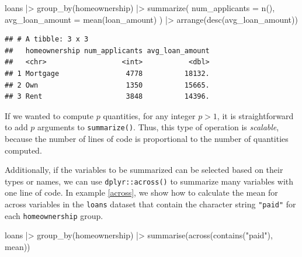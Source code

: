 \documentclass[12pt]{article}
\newenvironment{Shaded}{\begin{snugshade}}{\end{snugshade}}
\newcommand{\AttributeTok}[1]{\textcolor[rgb]{0.77,0.63,0.00}{#1}}
\newcommand{\FunctionTok}[1]{\textcolor[rgb]{0.00,0.00,0.00}{#1}}
\newcommand{\NormalTok}[1]{#1}
\newcommand{\SpecialCharTok}[1]{\textcolor[rgb]{0.00,0.00,0.00}{#1}}
\newcommand{\StringTok}[1]{\textcolor[rgb]{0.31,0.60,0.02}{#1}}
\begin{document}
\linespread{1}

\begin{Shaded}
\begin{Highlighting}[]
\NormalTok{loans }\SpecialCharTok{|\textgreater{}}
  \FunctionTok{group\_by}\NormalTok{(homeownership) }\SpecialCharTok{|\textgreater{}}
  \FunctionTok{summarize}\NormalTok{(}
    \AttributeTok{num\_applicants =} \FunctionTok{n}\NormalTok{(),}
    \AttributeTok{avg\_loan\_amount =} \FunctionTok{mean}\NormalTok{(loan\_amount)}
\NormalTok{  ) }\SpecialCharTok{|\textgreater{}}
  \FunctionTok{arrange}\NormalTok{(}\FunctionTok{desc}\NormalTok{(avg\_loan\_amount))}
\end{Highlighting}
\end{Shaded}

\begin{verbatim}
## # A tibble: 3 x 3
##   homeownership num_applicants avg_loan_amount
##   <chr>                  <int>           <dbl>
## 1 Mortgage                4778          18132.
## 2 Own                     1350          15665.
## 3 Rent                    3848          14396.
\end{verbatim}


\label{tidy-summary-again} \linespread{2}
\vspace{3mm}\setlength{\parindent}{15pt}

If we wanted to compute \(p\) quantities, for any integer \(p > 1\), it
is straightforward to add \(p\) arguments to \texttt{summarize()}. Thus,
this type of operation is \emph{scalable}, because the number of lines
of code is proportional to the number of quantities computed.

Additionally, if the variables to be summarized can be selected based on
their types or names, we can use \texttt{dplyr::across()} to summarize
many variables with one line of code. In example \ref{across}, we show
how to calculate the mean for across variables in the \texttt{loans}
dataset that contain the character string \texttt{"paid"} for each
\texttt{homeownership} group.

\linespread{1}

\begin{Shaded}
\begin{Highlighting}[]
\NormalTok{loans }\SpecialCharTok{|\textgreater{}} 
  \FunctionTok{group\_by}\NormalTok{(homeownership) }\SpecialCharTok{|\textgreater{}} 
  \FunctionTok{summarise}\NormalTok{(}\FunctionTok{across}\NormalTok{(}\FunctionTok{contains}\NormalTok{(}\StringTok{"paid"}\NormalTok{), mean))}
\end{Highlighting}
\end{Shaded}
\end{document}
